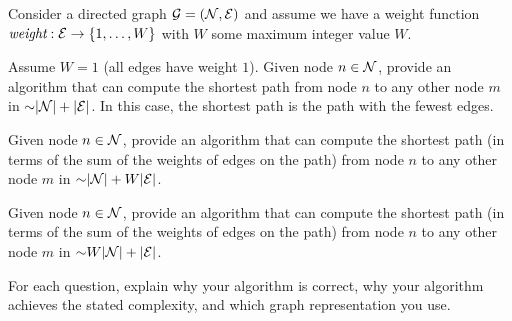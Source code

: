 \begin{problem}
Consider a directed graph $\mathcal{G} = (\mathcal{N}, \mathcal{E})$ and assume we have a weight function $\mathord{\textit{weight}} : \mathcal{E} \rightarrow \{1, \dots, W\}$ with $W$ some maximum integer value $W$.
\begin{questions}
\item Assume $W = 1$ (all edges have weight $1$). Given node $n \in \mathcal{N}$, provide an algorithm that can compute the shortest path from node $n$ to any other node $m$ in $\mathord{\sim}\lvert \mathcal{N} \rvert + \lvert \mathcal{E} \rvert$. In this case, the shortest path is the path with the fewest edges.
\item Given node $n \in \mathcal{N}$, provide an algorithm that can compute the shortest path (in terms of the sum of the weights of edges on the path) from node $n$ to any other node $m$ in $\mathord{\sim}\lvert \mathcal{N} \rvert + W\lvert \mathcal{E} \rvert$.
\item Given node $n \in \mathcal{N}$, provide an algorithm that can compute the shortest path (in terms of the sum of the weights of edges on the path) from node $n$ to any other node $m$ in $\mathord{\sim}W\lvert \mathcal{N} \rvert + \lvert \mathcal{E} \rvert$.
\end{questions}
For each question, explain why your algorithm is correct, why your algorithm achieves the stated complexity, and which graph representation you use.
\end{problem}

\SUBMITMSG{}
\DEFAULTGRADING{}

